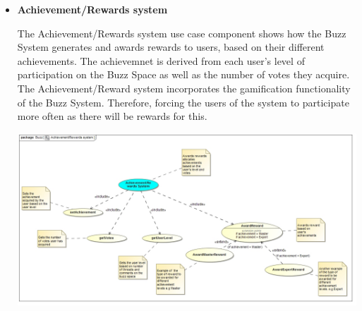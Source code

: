 \documentclass[a4paper,12pt]{report}
\begin{document}
\begin{itemize}
\begin{center}
		\end{center}
	\item \textbf{Achievement/Rewards system}
		\begin{flushleft}
		The Achievement/Rewards system use case component shows how the Buzz System generates and awards rewards to users, based on their different achievements. The achievemnet is derived from each user's level of participation on the Buzz Space as well as the number of votes they acquire. The Achievement/Reward system incorporates the gamification functionality of the Buzz System. Therefore, forcing the users of the system to participate more often as there will be rewards for this.
		\end{flushleft} 
		\begin{center}
		\includegraphics[width=1\textwidth]{../Goodness/Achievement_Rewards_System_Use_case_Diagram.jpg}\\[0.4cm]
		\end{center}
\end{itemize}
\end{document}
